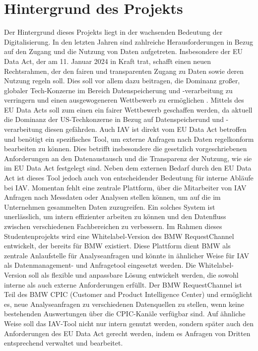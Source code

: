 \section{Hintergrund des Projekts}
Der Hintergrund dieses Projekts liegt in der wachsenden Bedeutung der Digitalisierung. In den letzten Jahren sind zahlreiche Herausforderungen in Bezug auf den Zugang und die Nutzung von Daten aufgetreten. Insbesondere der EU Data Act, der am 11. Januar 2024 in Kraft trat, schafft einen neuen Rechtsrahmen, der den fairen und transparenten Zugang zu Daten sowie deren Nutzung regeln soll. Dies soll vor allem dazu beitragen, die Dominanz großer, globaler Tech-Konzerne im Bereich Datenspeicherung und -verarbeitung zu verringern und einen ausgewogeneren Wettbewerb zu ermöglichen .\cite{EUData_JohnerInstitut,bmdv2024}
\newline
Mittels des EU Data Acts soll zum einen ein fairer Wettbewerb geschaffen werden, da aktuell die Dominanz der US-Techkonzerne in Bezug auf Datenspeicherund und -verarbeitung diesen gefährden. \cite{EUData_JohnerInstitut}
\newline
Auch IAV ist direkt vom EU Data Act betroffen und benötigt ein spezifisches Tool, um externe Anfragen nach Daten regelkonform bearbeiten zu können. Dies betrifft insbesondere die gesetzlich vorgeschriebenen Anforderungen an den Datenaustausch und die Transparenz der Nutzung, wie sie im EU Data Act festgelegt sind.
\newline
Neben dem externen Bedarf durch den EU Data Act ist dieses Tool jedoch auch von entscheidender Bedeutung für interne Abläufe bei IAV. Momentan fehlt eine zentrale Plattform, über die Mitarbeiter von IAV Anfragen nach Messdaten oder Analysen stellen können, um auf die im Unternehmen gesammelten Daten zuzugreifen. Ein solches System ist unerlässlich, um intern effizienter arbeiten zu können und den Datenfluss zwischen verschiedenen Fachbereichen zu verbessern. 
\newline
\newline
Im Rahmen dieses Studentenprojekts wird eine Whitelabel-Version des BMW RequestChannel entwickelt, der bereits für BMW existiert. Diese Plattform dient BMW als zentrale Anlaufstelle für Analyseanfragen und könnte in ähnlicher Weise für IAV als Datenmanagement- und Anfragetool eingesetzt werden. Die Whitelabel-Version soll als flexible und anpassbare Lösung entwickelt werden, die sowohl interne als auch externe Anforderungen erfüllt.
\newline
Der BMW RequestChannel ist Teil des BMW CPIC (Customer and Product Intelligence Center) und ermöglicht es, neue Analyseanfragen zu verschiedenen Datenquellen zu stellen, wenn keine bestehenden Auswertungen über die CPIC-Kanäle verfügbar sind. Auf ähnliche Weise soll das IAV-Tool nicht nur intern genutzt werden, sondern später auch den Anforderungen des EU Data Act gerecht werden, indem es Anfragen von Dritten entsprechend verwaltet und bearbeitet.

